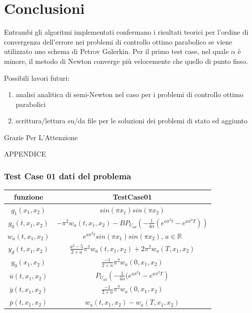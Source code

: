 \documentclass{beamer}
\theoremstyle{definition}
\theoremstyle{remark}
\theoremstyle{plain}
\theoremstyle{definition}
\begin{document}
\section{Conclusioni}
\begin{frame}
Entrambi gli algoritmi implementati confermano i risultati teorici per l'ordine di convergenza dell'errore nei problemi di controllo ottimo parabolico se viene utilizzato uno schema di Petrov Galerkin.
Per il primo test case, nel quale $\alpha$ è minore, il metodo di Newton converge più velocemente che quello di punto fisso.

Possibili lavori futuri:
\begin{enumerate}
\item analisi analitica di semi-Newton nel caso per i problemi di controllo ottimo parabolici
\item scrittura/lettura su/da file per le soluzioni dei problemi di stato ed aggiunto
\end{enumerate}

\end{frame}

\begin{frame}
\centering
Grazie Per L'Attenzione
\end{frame}

\begin{frame}
APPENDICE
\end{frame}

\begin{frame}
\frametitle{Test Case 01 dati del problema}
\begin{tabular}{|c|c|}
\hline
\textbf{funzione} & \textbf{TestCase01}\\
\hline
$g_1(x_1,x_2)$ & $sin({\pi}x_1)sin({\pi}x_2)$\\
\hline
$g_0(t,x_1,x_2)$ & $ -{\pi}^2w_a(t,x_1,x_2) - BP_{U_{ad}} \left( -\frac{1}{4\alpha} (e^{a{\pi}^2t} - e^{a{\pi}^2T}) \right)$ \\
\hline
$w_a(t,x_1,x_2)$ & $e^{a{\pi}^2t}sin({\pi}x_1)sin({\pi}x_2) \text{, } a \in \mathbb{R}$ \\
\hline
$y_d(t,x_1,x_2)$ & $\frac{a^2 - 5}{2 + a}{\pi}^2w_a(t,x_1,x_2) + 2{\pi}^2w_a(T,x_1,x_2)$ \\
\hline
$y_0(x_1,x_2)$ & $\frac{- 1}{2 + a}{\pi}^2w_a(0,x_1,x_2)$ \\
\hline
$\overline{u}(t,x_1,x_2)$ & $P_{U_{ad}} \left( -\frac{1}{4\alpha}(e^{a{\pi}^2t}-e^{a{\pi}^2T} \right)$ \\
\hline
$\overline{y}(t,x_1,x_2)$ & $\frac{- 1}{2 + a}{\pi}^2w_a(0,x_1,x_2)$ \\
\hline
$\overline{p}(t,x_1,x_2)$ & $w_a(t,x_1,x_2) - w_a(T,x_1,x_2)$ \\
\hline
\end{tabular}

\end{frame}
\end{document}
